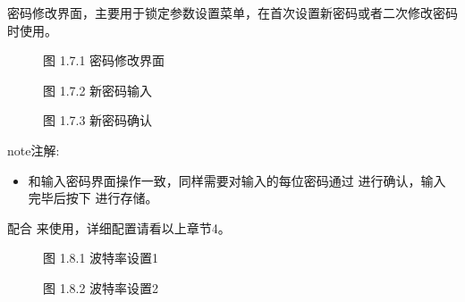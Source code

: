 \documentclass[a4paper,10pt,english]{sphinxmanual}
\begin{document}
\sphinxAtStartPar
{}

\sphinxAtStartPar
密码修改界面，主要用于锁定参数设置菜单，在首次设置新密码或者二次修改密码时使用。

\begin{figure}[htbp]
\centering
\capstart

\noindent{}
\caption{图 1.7.1 密码修改界面}\label{\detokenize{operation_guide:id17}}\end{figure}

\begin{figure}[htbp]
\centering
\capstart

\noindent{}
\caption{图 1.7.2 新密码输入}\label{\detokenize{operation_guide:id18}}\end{figure}

\begin{figure}[htbp]
\centering
\capstart

\noindent{}
\caption{图 1.7.3 新密码确认}\label{\detokenize{operation_guide:id19}}\end{figure}

\begin{sphinxadmonition}{note}{注解:}\begin{itemize}
\item {} 
\sphinxAtStartPar
和输入密码界面操作一致，同样需要对输入的每位密码通过  进行确认，输入完毕后按下  进行存储。

\end{itemize}
\end{sphinxadmonition}

\sphinxAtStartPar
{}

\sphinxAtStartPar
配合  来使用，详细配置请看以上章节4。

\begin{figure}[htbp]
\centering
\capstart

\noindent{}
\caption{图 1.8.1 波特率设置1}\label{\detokenize{operation_guide:id20}}\end{figure}

\begin{figure}[htbp]
\centering
\capstart

\noindent{}
\caption{图 1.8.2 波特率设置2}\label{\detokenize{operation_guide:id21}}\end{figure}
\end{document}

